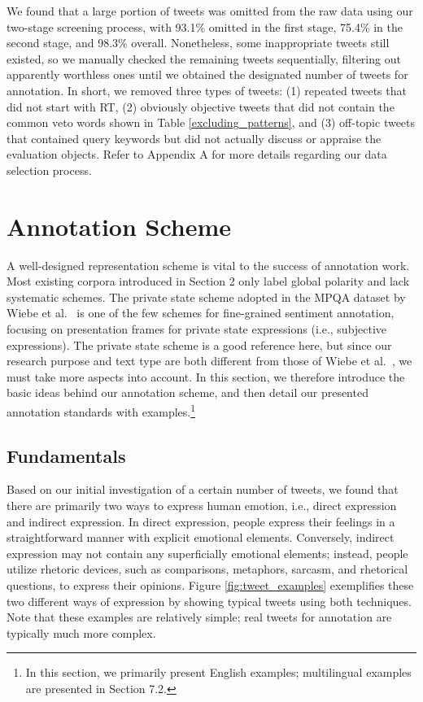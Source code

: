 \documentclass[english]{jnlp_1.4}
\begin{document}
We found that a large portion of tweets was omitted from the raw data using our two-stage screening process, with 93.1\% omitted in the first stage, 75.4\% in the second stage, and 98.3\% overall. Nonetheless, some inappropriate tweets still existed, so we manually checked the remaining tweets sequentially, filtering out apparently worthless ones until we obtained the designated number of tweets for annotation. In short, we removed three types of tweets: (1) repeated tweets that did not start with RT, (2) obviously objective tweets that did not contain the common veto words shown in Table \ref{excluding_patterns}, and (3) off-topic tweets that contained query keywords but did not actually discuss or appraise the evaluation objects. Refer to Appendix A for more details regarding our data selection process.


\section{Annotation Scheme}

A well-designed representation scheme is vital to the success of annotation work. Most existing corpora introduced in Section 2 only label global polarity and lack systematic schemes. The private state scheme adopted in the MPQA dataset by Wiebe et al.\ \citeyear{Wiebe05} is one of the few schemes for fine-grained sentiment annotation, focusing on presentation frames for private state expressions (i.e., subjective expressions). The private state scheme is a good reference here, but since our research purpose and text type are both different from those of Wiebe et al.\ \citeyear{Wiebe05}, we must take more aspects into account. In this section, we therefore introduce the basic ideas behind our annotation scheme, and then detail our presented annotation standards with examples.\footnote{In this section, we primarily present English examples; multilingual examples are presented in Section 7.2.}


\subsection{Fundamentals}

Based on our initial investigation of a certain number of tweets, we found that there are primarily two ways to express human emotion, i.e., direct expression and indirect expression. In direct expression, people express their feelings in a straightforward manner with explicit emotional elements. Conversely, indirect expression may not contain any superficially emotional elements; instead, people utilize rhetoric devices, such as comparisons, metaphors, sarcasm, and rhetorical questions, to express their opinions. Figure \ref{fig:tweet_examples} exemplifies these two different ways of expression by showing typical tweets using both techniques. Note that these examples are relatively simple; real tweets for annotation are typically much more complex.
\end{document}

